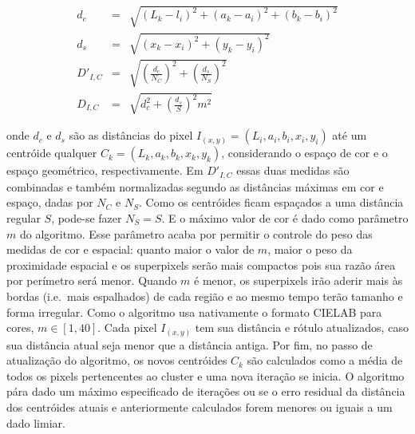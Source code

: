 \begin{eqnarray}
  d_c      & = & \sqrt{(L_k - l_i)^2 + (a_k - a_i)^2 + (b_k - b_i)^2} \\
  d_s      & = & \sqrt{(x_k - x_i)^2 + (y_k - y_i)^2} \\
  D'_{I,C}  & = & \sqrt{(\frac{d_c}{N_C})^2 + (\frac{d_s}{N_S})^2} \\
  D_{I,C}   & = & \sqrt{d_c^2 + (\frac{d_s}{S})^2 m^2}
\end{eqnarray}

\noindent onde $d_c$ e $d_s$ são as distâncias do pixel $I_{(x,y)} = (L_i, a_i,
b_i, x_i, y_i)$ até um centróide qualquer $C_k = (L_k, a_k, b_k, x_k, y_k)$,
considerando o espaço de cor e o espaço geométrico, respectivamente. Em
$D'_{I,C}$ essas duas medidas são combinadas e também normalizadas segundo as
distâncias máximas em cor e espaço, dadas por $N_C$ e $N_S$. Como os centróides
ficam espaçados a uma distância regular $S$, pode-se fazer $N_S = S$. E o máximo
valor de cor é dado como parâmetro $m$ do algoritmo. Esse parâmetro acaba por
permitir o controle do peso das medidas de cor e espacial: quanto maior o valor
de $m$, maior o peso da proximidade espacial e os superpixels serão mais
compactos pois sua razão área por perímetro será menor. Quando $m$ é menor, os
superpixels irão aderir mais às bordas (i.e.\ mais espalhados) de cada região e
ao mesmo tempo terão tamanho e forma irregular. Como o algoritmo usa nativamente
o formato CIELAB para cores, $m \in [1, 40]$. Cada pixel $I_{(x,y)}$ tem sua
distância e rótulo atualizados, caso sua distância atual seja menor que a
distância antiga. Por fim, no passo de atualização do algoritmo, os novos
centróides $C_k$ são calculados como a média de todos os pixels pertencentes ao
cluster e uma nova iteração se inicia. O algoritmo pára dado um máximo
especificado de iterações ou se o erro residual da distância dos centróides
atuais e anteriormente calculados forem menores ou iguais a um
dado limiar.

